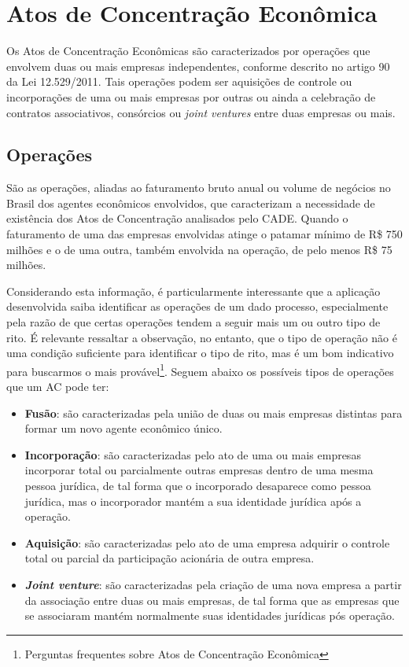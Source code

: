 \documentclass[11pt]{report}
\begin{document}
\section{Atos de Concentração Econômica}

\indent\indent Os Atos de Concentração Econômicas são caracterizados por operações que envolvem duas ou mais empresas independentes, conforme descrito no artigo 90 da Lei 12.529/2011. Tais operações
podem ser aquisições de controle ou incorporações de uma ou mais empresas por outras ou ainda a celebração de contratos associativos, consórcios ou \textit{joint ventures} entre duas
empresas ou mais.

\subsection{Operações}

\indent\indent São as operações, aliadas ao faturamento bruto anual ou volume de negócios no Brasil dos agentes econômicos envolvidos, que caracterizam a necessidade de existência dos
Atos de Concentração analisados pelo CADE. Quando o faturamento de uma das empresas envolvidas atinge o patamar mínimo de R\$ 750 milhões e o de uma outra, também envolvida na operação,
de pelo menos R\$ 75 milhões.

Considerando esta informação, é particularmente interessante que a aplicação desenvolvida saiba identificar as operações de um dado processo, especialmente
pela razão de que certas operações tendem a seguir mais um ou outro tipo de rito. É relevante ressaltar a observação, no entanto, que o tipo de operação não é uma condição suficiente
para identificar o tipo de rito, mas é um bom indicativo para buscarmos o mais provável\footnote[4]{Perguntas frequentes sobre Atos de Concentração Econômica}. Seguem abaixo
os possíveis tipos de operações que um AC pode ter:

\begin{itemize}
  \item \textbf{Fusão}: são caracterizadas pela união de duas ou mais empresas distintas para formar um novo agente econômico único.
  \item \textbf{Incorporação}: são caracterizadas pelo ato de uma ou mais empresas incorporar total ou parcialmente outras empresas dentro de uma mesma pessoa jurídica,
  de tal forma que o incorporado desaparece como pessoa jurídica, mas o incorporador mantém a sua identidade jurídica após a operação.
  \item \textbf{Aquisição}: são caracterizadas pelo ato de uma empresa adquirir o controle total ou parcial da participação acionária de outra empresa.
  \item \textbf{\textit{Joint venture}}: são caracterizadas pela criação de uma nova empresa a partir da associação entre duas ou mais empresas, de tal forma
  que as empresas que se associaram mantém normalmente suas identidades jurídicas pós operação.
\end{itemize}
\end{document}
